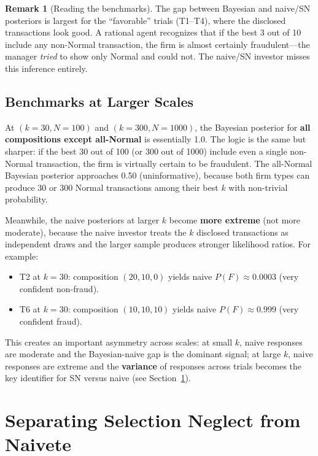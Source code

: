 \documentclass[12pt]{article}
\theoremstyle{definition}
\newtheorem{remark}{Remark}
\begin{document}
\begin{remark}[Reading the benchmarks]
The gap between Bayesian and naive/SN posteriors is largest for the ``favorable'' trials (T1--T4), where the disclosed transactions look good. A rational agent recognizes that if the best 3 out of 10 include any non-Normal transaction, the firm is almost certainly fraudulent---the manager \emph{tried} to show only Normal and could not. The naive/SN investor misses this inference entirely.
\end{remark}

\subsection{Benchmarks at Larger Scales}

At $(k=30, N=100)$ and $(k=300, N=1000)$, the Bayesian posterior for \textbf{all compositions except all-Normal} is essentially 1.0. The logic is the same but sharper: if the best 30 out of 100 (or 300 out of 1000) include even a single non-Normal transaction, the firm is virtually certain to be fraudulent. The all-Normal Bayesian posterior approaches 0.50 (uninformative), because both firm types can produce 30 or 300 Normal transactions among their best $k$ with non-trivial probability.

Meanwhile, the naive posteriors at larger $k$ become \textbf{more extreme} (not more moderate), because the naive investor treats the $k$ disclosed transactions as independent draws and the larger sample produces stronger likelihood ratios. For example:
\begin{itemize}[nosep]
\item T2 at $k=30$: composition $(20, 10, 0)$ yields naive $P(F) \approx 0.0003$ (very confident non-fraud).
\item T6 at $k=30$: composition $(10, 10, 10)$ yields naive $P(F) \approx 0.999$ (very confident fraud).
\end{itemize}

This creates an important asymmetry across scales: at small $k$, naive responses are moderate and the Bayesian-naive gap is the dominant signal; at large $k$, naive responses are extreme and the \textbf{variance} of responses across trials becomes the key identifier for SN versus naive (see Section~\ref{sec:separation}).


\section{Separating Selection Neglect from Naivete}
\label{sec:separation}
\end{document}
